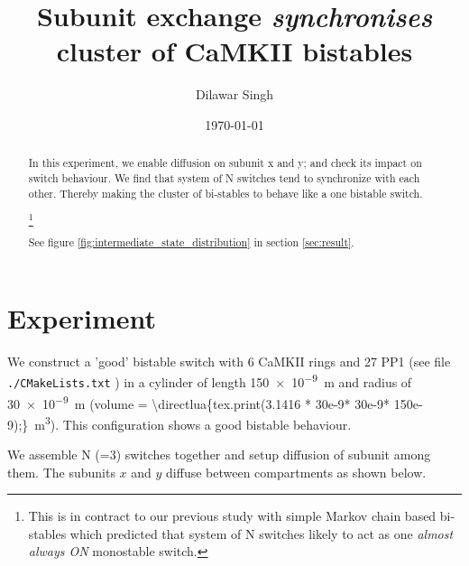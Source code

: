 \documentclass[a4paper]{article}
\title{Subunit exchange \emph{synchronises} cluster of CaMKII bistables}
\author{Dilawar Singh}
\date{\today}
\begin{document}
\maketitle

\begin{abstract}

    In this experiment, we enable diffusion on subunit x and y; and check its
    impact on switch behaviour. We find that system of N switches tend to
    synchronize with each other. Thereby making the cluster of bi-stables to behave like a  one bistable
    switch. 

    \footnote{
        This is in contract to our previous study with simple Markov chain
        based bi-stables which predicted that system of N switches likely to act as
        one \emph{almost always ON} monostable switch.
    }

    See figure \ref{fig:intermediate_state_distribution} in section \ref{sec:result}.

\end{abstract}

    

\section{Experiment}
\label{sec:Experiment}

\edef\length{150e-9} \edef\radius{30e-9}
\newcommand\vol{\directlua{tex.print(3.1416 * \radius * \radius * \length);}}

We construct a 'good' bistable switch with 6 CaMKII rings and 27 PP1 (see file {\tt
./CMakeLists.txt} ) in a cylinder of length \SI{\length}{ \meter} and radius of
\SI{\radius}{\meter}  (volume = \SI{\vol}{\meter ^3}). This configuration shows
a good bistable behaviour.

We assemble N (=3) switches together and setup diffusion of subunit among them.
The subunits $x$ and $y$ diffuse between compartments as shown below.

\end{document}
